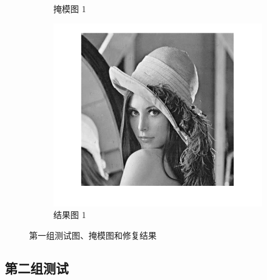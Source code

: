 \documentclass[UTF8]{ctexart}
\begin{document}
\begin{figure}[H]
\begin{subfigure}[b]{0.3\textwidth}
        \caption{掩模图 1}
        \label{fig:mask1}
    \end{subfigure}
    \hfill
    \begin{subfigure}[b]{0.3\textwidth}
        \includegraphics[width=\textwidth]{res.png} %
        \caption{结果图 1}
        \label{fig:res1}
    \end{subfigure}
    \caption{第一组测试图、掩模图和修复结果}
    \label{fig:group1}
\end{figure}

\subsection{第二组测试}
\end{document}
